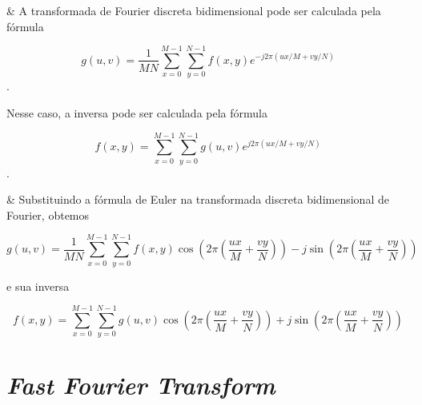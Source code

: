 \begin{easylist}
  & A transformada de Fourier discreta bidimensional pode ser calculada pela fórmula

  \[ g(u, v) = \frac 1{MN} \sum^{M-1}_{x=0}\sum^{N-1}_{y=0} f(x, y) e^{-j2\pi (ux/M + vy/N)} \].

  Nesse caso, a inversa pode ser calculada pela fórmula

  \[ f(x, y) =             \sum^{M-1}_{x=0}\sum^{N-1}_{y=0} g(u, v) e^{ j2\pi (ux/M + vy/N)} \].

  
  & Substituindo a fórmula de Euler na transformada discreta bidimensional de Fourier, obtemos

  \[ g(u, v) = \frac 1{MN} \sum^{M-1}_{x=0}\sum^{N-1}_{y=0} f(x, y)
      \cos\left(2\pi \left(\frac{ux}{M} + \frac{vy}{N}\right)\right) -
     j\sin\left(2\pi \left(\frac{ux}{M} + \frac{vy}{N}\right)\right)   \]

  e sua inversa

  \[ f(x, y) =             \sum^{M-1}_{x=0}\sum^{N-1}_{y=0} g(u, v)
      \cos\left(2\pi \left(\frac{ux}{M} + \frac{vy}{N}\right)\right) +
     j\sin\left(2\pi \left(\frac{ux}{M} + \frac{vy}{N}\right)\right)   \]

\end{easylist}
  
\section{\textit{Fast Fourier Transform}}

